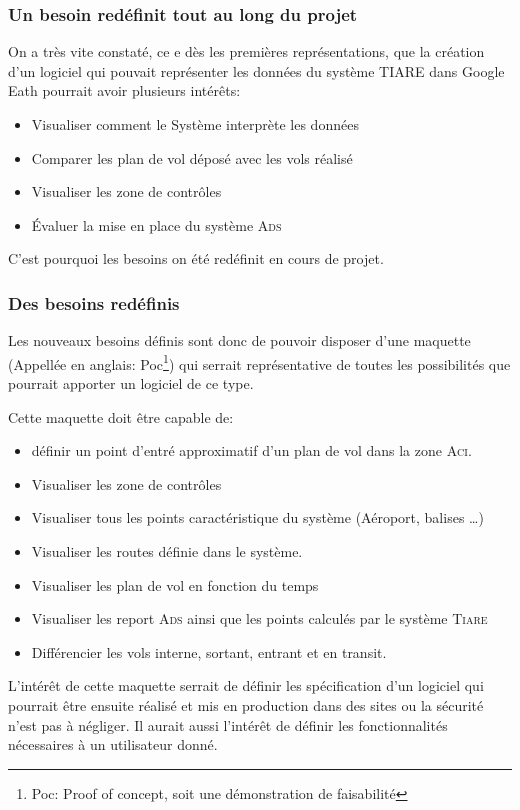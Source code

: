         \subsubsection{Un besoin redéfinit tout au long du projet}
On a très vite constaté, ce e dès les premières représentations,  que la création d'un logiciel qui pouvait représenter les données du système TIARE dans Google Eath pourrait avoir plusieurs intérêts:
\begin{itemize}
\item Visualiser comment le Système interprète les données
\item Comparer les plan de vol déposé avec les vols réalisé
\item Visualiser les zone de contrôles
\item Évaluer la mise en place du système \textsc{Ads}
\end{itemize}
C'est pourquoi les besoins on été redéfinit en cours de projet.

        \subsubsection{Des besoins redéfinis}
Les nouveaux besoins définis sont donc de pouvoir disposer d'une maquette (Appellée en anglais: Poc\footnote{Poc: Proof of concept, soit une démonstration de faisabilité}) qui serrait représentative de toutes les possibilités que pourrait apporter un logiciel de ce type.

Cette maquette doit être capable de:
\begin{itemize}
\item définir un point d'entré approximatif d'un plan de vol dans la zone \textsc{Aci}.
\item Visualiser les zone de contrôles
\item Visualiser tous les points caractéristique du système (Aéroport, balises …)
\item Visualiser les routes définie dans le système.
\item Visualiser les plan de vol en fonction du temps
\item Visualiser les report \textsc{Ads} ainsi que les points calculés par le système \textsc{Tiare}
\item Différencier les vols interne, sortant, entrant et en transit.
\end{itemize}

L’intérêt de cette maquette serrait de définir les spécification d'un logiciel qui pourrait être ensuite réalisé et mis en production dans des sites ou la sécurité n'est pas à négliger. Il aurait aussi l’intérêt de définir les fonctionnalités nécessaires à un utilisateur donné.
